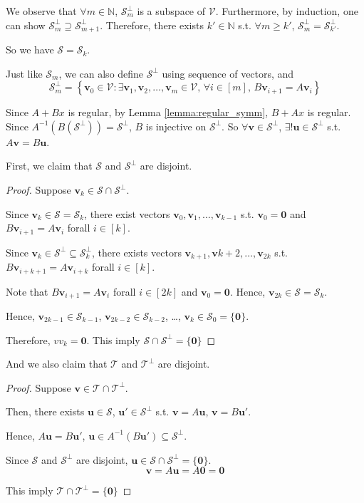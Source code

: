 \documentclass{article}
\newcommand{\0}{\mathbf{0}}
\renewcommand{\vec}{\mathbf}
\newcommand{\vv}{\vec{v}}
\newcommand{\vu}{\vec{u}}
\newcommand{\inv}{^{-1}}
\newcommand{\N}{\mathbb{N}}
\newcommand{\vecspace}[1]{\mathcal{#1}}
\newcommand{\vsV}{\vecspace{V}}
\newcommand{\vsS}{\vecspace{S}}
\newcommand{\vsT}{\vecspace{T}}
\newcommand{\vsSp}{\vecspace{S}^\perp}
\newcommand{\vsTp}{\vecspace{T}^\perp}
\begin{document}
We observe that $\forall m\in\N$, $\vsSp_m$ is a subspace of $\vsV$.
Furthermore, by induction, one can show $\vsSp_m\supseteq\vsSp_{m+1}$.
Therefore, there exists $k'\in\N$ s.t. $\forall m\ge k'$, $\vsSp_m = \vsSp_{k'}$.

So we have $\vsS = \vsS_k$.

Just like $\vsS_m$, we can also define $\vsSp$ using sequence of vectors, and
\begin{equation*}
    \vsSp_m = \left\{\vv_0\in\vsV:\exists \vv_1,\vv_2,\dots,\vv_m\in\vsV,\, \forall i \in [m],\, B\vv_{i+1}=A\vv_i\right\}
\end{equation*}

Since $A+Bx$ is regular, by Lemma \ref{lemma:regular_symm}, $B+Ax$ is regular.
Since $A\inv(B(\vsSp))=\vsSp$, $B$ is injective on $\vsSp$.
So $\forall\vv\in\vsSp$, $\exists!\vu\in\vsSp$ s.t. $A\vv=B\vu$.

First, we claim that $\vsS$ and $\vsSp$ are disjoint.
\begin{proof}
    Suppose $\vv_k\in\vsS\cap\vsSp$.

    Since $\vv_k\in\vsS=\vsS_k$, there exist vectors $\vv_0,\vv_1,\dots,\vv_{k-1}$ s.t. $\vv_0=\0$ and $B\vv_{i+1}=A\vv_i$ forall $i\in[k]$.

    Since $\vv_k\in\vsSp\subseteq\vsSp_k$, there exists vectors $\vv_{k+1},\vv{k+2},\dots,\vv_{2k}$ s.t. $B\vv_{i+k+1}=A\vv_{i+k}$ forall $i\in[k]$.

    Note that $B\vv_{i+1}=A\vv_i$ forall $i\in[2k]$ and $\vv_0=\0$.
    Hence, $\vv_{2k}\in\vsS=\vsS_k$.

    Hence, $\vv_{2k-1}\in\vsS_{k-1}$, $\vv_{2k-2}\in\vsS_{k-2}$, \dots, $\vv_{k}\in\vsS_0=\{\0\}$.

    Therefore, $vv_k=\0$. This imply $\vsS\cap\vsSp = \{\0\}$
\end{proof}

And we also claim that $\vsT$ and $\vsTp$ are disjoint.
\begin{proof}
    Suppose $\vv\in\vsT\cap\vsTp$.

    Then, there exists $\vu\in\vsS$, $\vu'\in\vsSp$ s.t. $\vv=A\vu$, $\vv=B\vu'$.

    Hence, $A\vu=B\vu'$, $\vu\in A\inv(B\vu')\subseteq\vsSp$.

    Since $\vsS$ and $\vsSp$ are disjoint, $\vu\in\vsS\cap\vsSp=\{\0\}$.
    \begin{equation*}
        \vv=A\vu=A\0=\0
    \end{equation*}

    This imply $\vsT\cap\vsTp = \{\0\}$
\end{proof}
\end{document}
